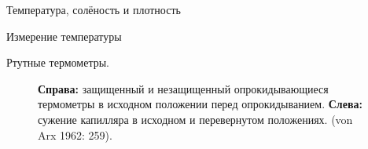 \begin{chapter}{Температура, солёность и плотность}
\begin{section}{Измерение температуры}
\begin{paragraph}{Ртутные термометры.}
\begin{figure}[t!]
\caption{\textbf{Справа:} защищенный и незащищенный опрокидывающиеся термометры
в исходном положении перед опрокидыванием. 
\textbf{Слева:} сужение капилляра в исходном и перевернутом положениях.
(von Arx 1962: 259).}
\label{fig:thermometer}
\end{figure}
%


\end{paragraph}
\end{section}
\end{chapter}
